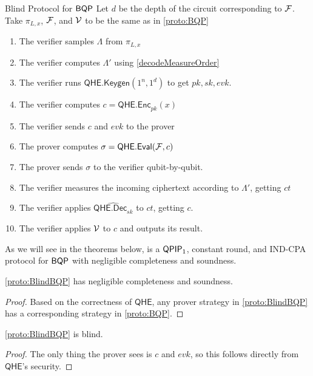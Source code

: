 \begin{protocol}{Blind Protocol for $\operatorname{\mathsf{BQP}}$}
	\label{proto:BlindBQP}
	Let $d$ be the depth of the circuit corresponding to $\mathcal{F}$.
	Take $\pi_{L, x}$, $\mathcal{F}$, and $\mathcal{V}$ to be the same as in \cref{proto:BQP}
	\begin{enumerate}
		\item The verifier samples $\Lambda$ from $\pi_{L, x}$
		\item The verifier computes $\Lambda'$ using \cref{decodeMeasureOrder}
		\item The verifier runs $\mathsf{QHE.Keygen}(1^n, 1^d)$ to get $pk, sk, evk$.
		\item The verifier computes $c=\mathsf{QHE.Enc}_{pk}(x)$
		\item The verifier sends $c$ and $evk$ to the prover
		\item The prover computes $\sigma=\mathsf{QHE.Eval}(\mathcal{F}, c)$
		\item The prover sends $\sigma$ to the verifier qubit-by-qubit.
		\item The verifier measures the incoming ciphertext according to $\Lambda'$, getting $ct$
		\item The verifier applies $\widehat{\mathsf{QHE.Dec}_{sk}}$ to $ct$, getting $c$.
		\item The verifier applies $\mathcal{V}$ to $c$ and outputs its result.
	\end{enumerate}
\end{protocol}

As we will see in the theorems below,  is a $\operatorname{\mathsf{QPIP}}_1$, constant round, and IND-CPA protocol for $\operatorname{\mathsf{BQP}}$ with negligible completeness and soundness.

\begin{thm}
	\cref{proto:BlindBQP} has negligible completeness and soundness.
\end{thm}
\begin{proof}
	Based on the correctness of $\mathsf{QHE}$, any prover strategy in \cref{proto:BlindBQP} has a corresponding strategy in \cref{proto:BQP}.
\end{proof}

\begin{thm}
	\cref{proto:BlindBQP} is blind.
\end{thm}
\begin{proof}
	The only thing the prover sees is $c$ and $evk$, so this follows directly from $\mathsf{QHE}$'s security.
\end{proof}

